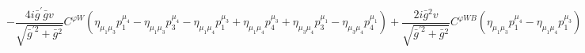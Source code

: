 %
\begin{dmath*}
%
  -  \frac{4 i {\bar g}^\prime {\bar g}{} v}{\sqrt{{\bar g}^{\prime 2} + {\bar g}{}^2}}C^{ \varphi  W} \left(\eta_{\mu_1 \mu_3} p_1^{\mu_4} - \eta_{\mu_1 \mu_3} p_3^{\mu_4} - \eta_{\mu_1 \mu_4} p_1^{\mu_3} + \eta_{\mu_1 \mu_4} p_4^{\mu_3} + \eta_{\mu_3 \mu_4} p_3^{\mu_1} - \eta_{\mu_3 \mu_4} p_4^{\mu_1}\right)  +  \frac{2 i {\bar g}{}^2 v}{\sqrt{{\bar g}^{\prime 2} + {\bar g}{}^2}}C^{ \varphi  WB} \left(\eta_{\mu_1 \mu_3} p_1^{\mu_4} - \eta_{\mu_1 \mu_4} p_1^{\mu_3}\right)
%
\end{dmath*}
%
